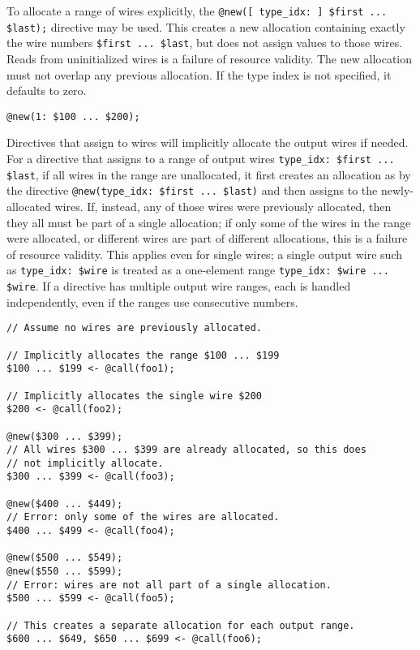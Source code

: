To allocate a range of wires explicitly, the \texttt{@new([ type\_idx: ] \$first ... \$last);} directive may be used.
This creates a new allocation containing exactly the wire numbers \texttt{\$first ... \$last},
but does not assign values to those wires.
Reads from uninitialized wires is a failure of resource validity. 
The new allocation must not overlap any previous allocation.
If the type index is not specified, it defaults to zero.

%
\begin{lstlisting}[language=ir]
@new(1: $100 ... $200);
\end{lstlisting}

Directives that assign to wires will implicitly allocate the output wires if needed.
For a directive that assigns to a range of output wires \texttt{type\_idx: \$first ... \$last},
if all wires in the range are unallocated, it first creates an allocation as by
the directive \texttt{@new(type\_idx: \$first ... \$last)} and then assigns to
the newly-allocated wires.
If, instead, any of those wires were previously allocated, then they all must
be part of a single allocation; if only some of the wires in the range were
allocated, or different wires are part of different allocations, this is a
failure of resource validity.
This applies even for single wires; a single output wire such as \texttt{type\_idx: \$wire}
is treated as a one-element range \texttt{type\_idx: \$wire ... \$wire}.
If a directive has multiple output wire ranges, each is handled independently,
even if the ranges use consecutive numbers.

\begin{lstlisting}[language=ir]
// Assume no wires are previously allocated.

// Implicitly allocates the range $100 ... $199
$100 ... $199 <- @call(foo1);

// Implicitly allocates the single wire $200
$200 <- @call(foo2);

@new($300 ... $399);
// All wires $300 ... $399 are already allocated, so this does
// not implicitly allocate.
$300 ... $399 <- @call(foo3);

@new($400 ... $449);
// Error: only some of the wires are allocated.
$400 ... $499 <- @call(foo4);

@new($500 ... $549);
@new($550 ... $599);
// Error: wires are not all part of a single allocation.
$500 ... $599 <- @call(foo5);

// This creates a separate allocation for each output range.
$600 ... $649, $650 ... $699 <- @call(foo6);
\end{lstlisting}

